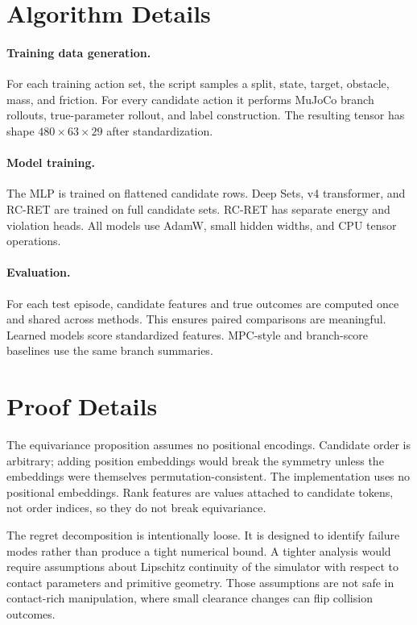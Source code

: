 \documentclass{article}
\newcommand{\method}{RC-RET}
\begin{document}
\section{Algorithm Details}

\paragraph{Training data generation.}
For each training action set, the script samples a split, state, target, obstacle, mass, and friction.  For every candidate action it performs MuJoCo branch rollouts, true-parameter rollout, and label construction.  The resulting tensor has shape $480 \times 63 \times 29$ after standardization.

\paragraph{Model training.}
The MLP is trained on flattened candidate rows.  Deep Sets, v4 transformer, and \method{} are trained on full candidate sets.  \method{} has separate energy and violation heads.  All models use AdamW, small hidden widths, and CPU tensor operations.

\paragraph{Evaluation.}
For each test episode, candidate features and true outcomes are computed once and shared across methods.  This ensures paired comparisons are meaningful.  Learned models score standardized features.  MPC-style and branch-score baselines use the same branch summaries.

\section{Proof Details}

The equivariance proposition assumes no positional encodings.  Candidate order is arbitrary; adding position embeddings would break the symmetry unless the embeddings were themselves permutation-consistent.  The implementation uses no positional embeddings.  Rank features are values attached to candidate tokens, not order indices, so they do not break equivariance.

The regret decomposition is intentionally loose.  It is designed to identify failure modes rather than produce a tight numerical bound.  A tighter analysis would require assumptions about Lipschitz continuity of the simulator with respect to contact parameters and primitive geometry.  Those assumptions are not safe in contact-rich manipulation, where small clearance changes can flip collision outcomes.
\end{document}
